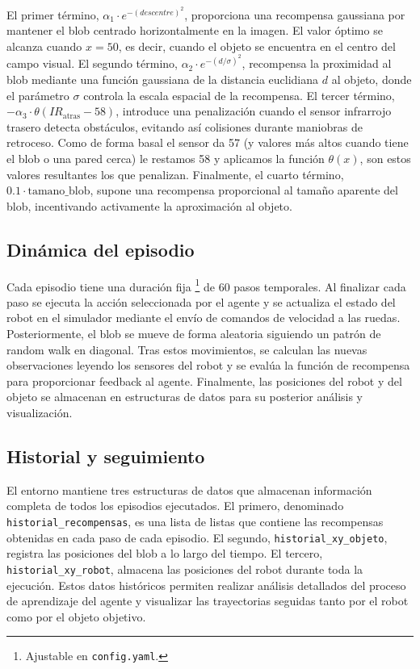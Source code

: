 \documentclass[12pt,a4paper]{article}
\begin{document}
El primer término, $\alpha_1 \cdot e^{-(descentre)^2}$, proporciona una recompensa gaussiana por mantener el blob centrado horizontalmente en la imagen. El valor óptimo se alcanza cuando $x = 50$, es decir, cuando el objeto se encuentra en el centro del campo visual. El segundo término, $\alpha_2 \cdot e^{-(d/\sigma)^2}$, recompensa la proximidad al blob mediante una función gaussiana de la distancia euclidiana $d$ al objeto, donde el parámetro $\sigma$ controla la escala espacial de la recompensa. El tercer término, $-\alpha_3 \cdot \theta (IR_{\text{atras}} - 58)$, introduce una penalización cuando el sensor infrarrojo trasero detecta obstáculos, evitando así colisiones durante maniobras de retroceso. Como de forma basal el sensor da 57 (y valores más altos cuando tiene el blob o una pared cerca) le restamos 58 y aplicamos la función $\theta (x)$, son estos valores resultantes los que penalizan. Finalmente, el cuarto término, $0.1 \cdot \text{tamano\_blob}$, supone una recompensa proporcional al tamaño aparente del blob, incentivando activamente la aproximación al objeto.


\subsection{Dinámica del episodio}

Cada episodio tiene una duración fija \footnote{Ajustable en \texttt{config.yaml}.} de 60 pasos temporales. Al finalizar cada
paso se ejecuta la acción seleccionada por el agente y se actualiza el estado
del robot en el simulador mediante el envío de comandos de velocidad a las
ruedas. Posteriormente, el blob se mueve de forma aleatoria siguiendo un patrón
de random walk en diagonal. Tras estos
movimientos, se calculan las nuevas observaciones leyendo los sensores del robot
y se evalúa la función de recompensa para proporcionar feedback al agente.
Finalmente, las posiciones del robot y del objeto se almacenan en estructuras de
datos para su posterior análisis y visualización.

\subsection{Historial y seguimiento}

El entorno mantiene tres estructuras de datos que almacenan información completa
de todos los episodios ejecutados. El primero, denominado
\texttt{historial\_recompensas}, es una lista de listas que contiene las
recompensas obtenidas en cada paso de cada episodio. El segundo,
\texttt{historial\_xy\_objeto}, registra las posiciones del blob a lo largo del
tiempo. El tercero, \texttt{historial\_xy\_robot}, almacena las posiciones del
robot durante toda la ejecución. Estos datos históricos permiten realizar
análisis detallados del proceso de aprendizaje del agente y visualizar las
trayectorias seguidas tanto por el robot como por el objeto objetivo.
\end{document}

